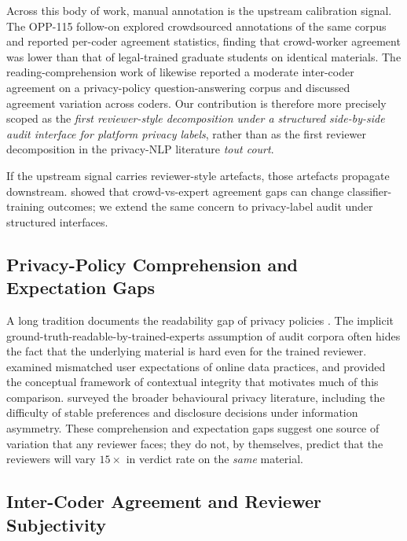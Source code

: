 \documentclass[11pt,a4paper]{article}
\begin{document}
Across this body of work, manual annotation is the upstream
calibration signal. The OPP-115 follow-on
\citep{wilson2016crowdsourcing} explored crowdsourced annotations of
the same corpus and reported per-coder agreement statistics, finding
that crowd-worker agreement was lower than that of legal-trained
graduate students on identical materials. The reading-comprehension
work of \citet{ravichander2019question} likewise reported a moderate
inter-coder agreement on a privacy-policy question-answering corpus
and discussed agreement variation across coders. Our contribution is
therefore more precisely scoped as the \emph{first reviewer-style
decomposition under a structured side-by-side audit interface for
platform privacy labels}, rather than as the first reviewer
decomposition in the privacy-NLP literature \emph{tout court}.

If the upstream signal carries reviewer-style artefacts, those
artefacts propagate downstream. \citet{wilson2016crowdsourcing}
showed that crowd-vs-expert agreement gaps can change
classifier-training outcomes; we extend the same concern to
privacy-label audit under structured interfaces.

\subsection{Privacy-Policy Comprehension and Expectation Gaps}
\label{sec:rel-comprehension}

A long tradition documents the readability gap of privacy policies
\citep{mcdonald2008cost,jensen2004privacy,fabian2017large}. The
implicit ground-truth-readable-by-trained-experts assumption of
audit corpora often hides the fact that the underlying material is
hard even for the trained reviewer. \citet{rao2016expecting} examined
mismatched user expectations of online data practices,
and \citet{nissenbaum2004privacy} provided the conceptual framework
of contextual integrity that motivates much of this comparison.
\citet{acquisti2015privacy} surveyed the broader behavioural privacy
literature, including the difficulty of stable preferences and
disclosure decisions under information asymmetry. These
comprehension and expectation gaps suggest one source of variation
that any reviewer faces; they do not, by themselves, predict that the
reviewers will vary $15{\times}$ in verdict rate on the \emph{same}
material.

\subsection{Inter-Coder Agreement and Reviewer Subjectivity}
\label{sec:rel-agreement}
\end{document}
